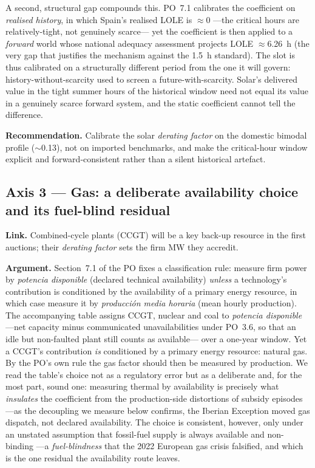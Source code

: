 \documentclass[11pt,a4paper]{article}
\begin{document}
A second, structural gap compounds this. PO~7.1 calibrates the coefficient on
\emph{realised history}, in which Spain's realised LOLE is $\approx$0 ---the critical
hours are relatively-tight, not genuinely scarce--- yet the coefficient is then applied
to a \emph{forward} world whose national adequacy assessment projects LOLE
$\approx$6.26~h (the very gap that justifies the mechanism against the 1.5~h standard).
The slot is thus calibrated on a structurally different period from the one it will
govern: history-without-scarcity used to screen a future-with-scarcity. Solar's
delivered value in the tight summer hours of the historical window need not equal its
value in a genuinely scarce forward system, and the static coefficient cannot tell the
difference.

\textbf{Recommendation.} Calibrate the solar \emph{derating factor} on the domestic
bimodal profile ($\sim$0.13), not on imported benchmarks, and make the critical-hour
window explicit and forward-consistent rather than a silent historical artefact.

\subsection{Axis 3 --- Gas: a deliberate availability choice and its fuel-blind residual}
\label{sec:eje3}

\textbf{Link.} Combined-cycle plants (CCGT) will be a key back-up resource in the
first auctions; their \emph{derating factor} sets the firm MW they accredit.

\textbf{Argument.} Section~7.1 of the PO fixes a classification rule:
measure firm power by \emph{potencia disponible} (declared technical availability)
\emph{unless} a technology's contribution is conditioned by the availability of a
primary energy resource, in which case measure it by \emph{producci\'on media
horaria} (mean hourly production). The accompanying table assigns CCGT, nuclear and
coal to \emph{potencia disponible} ---net capacity minus communicated unavailabilities
under PO~3.6, so that an idle but non-faulted plant still counts as available--- over a
one-year window. Yet a CCGT's contribution \emph{is} conditioned by a primary energy
resource: natural gas. By the PO's own rule the gas factor should then be measured by
production. We read the table's choice not as a regulatory error but as a deliberate
and, for the most part, sound one: measuring thermal by availability is precisely what
\emph{insulates} the coefficient from the production-side distortions of subsidy
episodes ---as the decoupling we measure below confirms, the Iberian Exception moved
gas dispatch, not declared availability. The choice is consistent, however, only under
an unstated assumption that fossil-fuel supply is always available and non-binding ---a
\emph{fuel-blindness} that the 2022 European gas crisis falsified, and which is the one
residual the availability route leaves.
\end{document}
